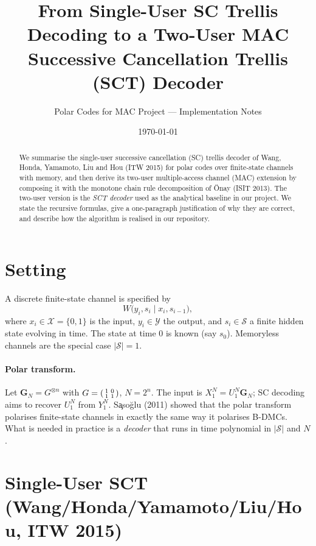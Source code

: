 \documentclass[11pt]{article}
\title{From Single-User SC Trellis Decoding to a Two-User MAC \\
       Successive Cancellation Trellis (SCT) Decoder}
\author{Polar Codes for MAC Project --- Implementation Notes}
\date{\today}
\newcommand{\bbY}{Y}
\newcommand{\bbU}{U}
\newcommand{\bbX}{X}
\begin{document}
\maketitle

\begin{abstract}
We summarise the single-user successive cancellation (SC) trellis decoder of
Wang, Honda, Yamamoto, Liu and Hou (ITW 2015) for polar codes over
finite-state channels with memory, and then derive its two-user
multiple-access channel (MAC) extension by composing it with the monotone
chain rule decomposition of \"{O}nay (ISIT 2013).  The two-user version is
the \emph{SCT decoder} used as the analytical baseline in our project.  We
state the recursive formulas, give a one-paragraph justification of why they
are correct, and describe how the algorithm is realised in our repository.
\end{abstract}

\section{Setting}

A discrete finite-state channel is specified by
\[
  W\bigl(y_i, s_i \mid x_i, s_{i-1}\bigr),
\]
where $x_i \in \mathcal{X}=\{0,1\}$ is the input, $y_i \in \mathcal{Y}$ the
output, and $s_i \in \mathcal{S}$ a finite hidden state evolving in time.
The state at time $0$ is known (say $s_0$).  Memoryless channels are the
special case $|\mathcal{S}|=1$.

\paragraph{Polar transform.}
Let $\mathbf{G}_N = G^{\otimes n}$ with $G=\begin{psmallmatrix}1&0\\1&1\end{psmallmatrix}$,
$N=2^n$.  The input is $\bbX_1^N = \bbU_1^N \mathbf{G}_N$; SC decoding aims to recover
$\bbU_1^N$ from $\bbY_1^N$.  S\c{a}so\u{g}lu (2011) showed that the polar
transform polarises finite-state channels in exactly the same way it
polarises B-DMCs.  What is needed in practice is a \emph{decoder} that runs
in time polynomial in $|\mathcal{S}|$ and $N$.

\section{Single-User SCT (Wang/Honda/Yamamoto/Liu/Hou, ITW 2015)}
\end{document}
